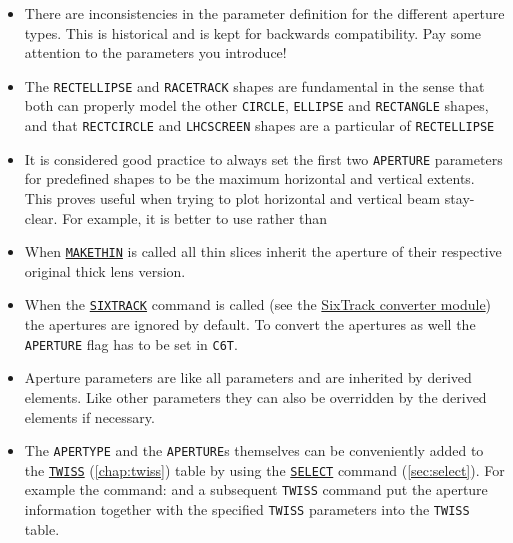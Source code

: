 \begin{itemize}
   \item There are inconsistencies in the parameter definition for the
     different aperture types. This is historical and is kept for
     backwards compatibility. Pay some attention to the parameters you
     introduce! 


	\item The \texttt{RECTELLIPSE}  and \texttt{RACETRACK} shapes are fundamental 
	in the sense that both can properly model the other \texttt{CIRCLE}, 
	\texttt{ELLIPSE} and \texttt{RECTANGLE} shapes, and that \texttt{RECTCIRCLE} 
	and \texttt{LHCSCREEN} shapes are a particular of \texttt{RECTELLIPSE}

	\item It is considered good practice to always set the first two 
	\texttt{APERTURE} parameters for predefined shapes to be the maximum
	horizontal and vertical extents. This proves useful when trying to 
	plot horizontal and vertical beam stay-clear. 
	For example, it is better to use
	rather than

   \item When \hyperref[chap:makethin]{\texttt{MAKETHIN}} is called all
     thin slices inherit the aperture of their respective original thick
     lens version.  

   \item When the \hyperref[chap:sixtrack]{\texttt{SIXTRACK}} command is called (see the
     \hyperref[chap:sixtrack]{SixTrack converter module}) the apertures are
     ignored by default. To convert the apertures as well the \texttt{APERTURE}
     flag has to be set in \texttt{C6T}.  

   \item  Aperture parameters are like all parameters and are inherited
     by derived elements. Like other parameters they can also be overridden by
     the derived elements if necessary.  

   \item The \texttt{APERTYPE} and the \texttt{APERTURE}s themselves can be
     conveniently added to the \hyperref[chap:twiss]{\texttt{TWISS}} 
     (\autoref{chap:twiss}) table by using the
     \hyperref[sec:select]{\texttt{SELECT}} command
     (\autoref{sec:select}). For example the command:     
     and a subsequent \texttt{TWISS} command put the aperture information together 
     with the specified \texttt{TWISS} parameters into the \texttt{TWISS} table.


\end{itemize}

